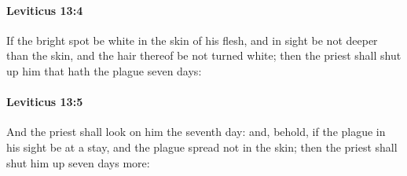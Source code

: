 		\paragraph{Leviticus 13:4} %
			\label{LEVITICUS-13-4}

			If the bright spot be white in the skin of his flesh, and in sight be not deeper than the skin, and the hair thereof be not turned white; then the priest shall shut up him that hath the plague seven days:


		\paragraph{Leviticus 13:5} %
			\label{LEVITICUS-13-5}

			And the priest shall look on him the seventh day: and, behold, if the plague in his sight be at a stay, and the plague spread not in the skin; then the priest shall shut him up seven days more:


